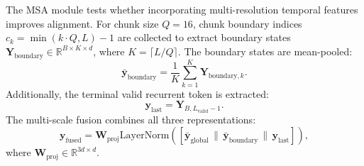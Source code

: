 \documentclass[10pt,journal,final]{IEEEtran}
\begin{document}
The MSA module tests whether incorporating multi-resolution temporal features improves alignment. For chunk size $Q=16$, chunk boundary indices $c_k = \min(k \cdot Q, L) - 1$ are collected to extract boundary states $\mathbf{Y}_{\mathrm{boundary}} \in \mathbb{R}^{B \times K \times d}$, where $K = \lceil L / Q \rceil$. The boundary states are mean-pooled:
\begin{equation}
\label{eq:boundary_mean}
\bar{\mathbf{y}}_{\mathrm{boundary}} = \frac{1}{K}\sum_{k=1}^K \mathbf{Y}_{\mathrm{boundary}, k}.
\end{equation}
Additionally, the terminal valid recurrent token is extracted:
\begin{equation}
\label{eq:terminal_state}
\mathbf{y}_{\mathrm{last}} = \mathbf{Y}_{B, L_{\mathrm{valid}}-1}.
\end{equation}
The multi-scale fusion combines all three representations:
\begin{equation}
\label{eq:msa_fusion}
\mathbf{y}_{\mathrm{fused}} = \mathbf{W}_{\mathrm{proj}} \mathrm{LayerNorm}\left( [\bar{\mathbf{y}}_{\mathrm{global}} \,\|\, \bar{\mathbf{y}}_{\mathrm{boundary}} \,\|\, \mathbf{y}_{\mathrm{last}}] \right),
\end{equation}
where $\mathbf{W}_{\mathrm{proj}} \in \mathbb{R}^{3d \times d}$.
\end{document}
